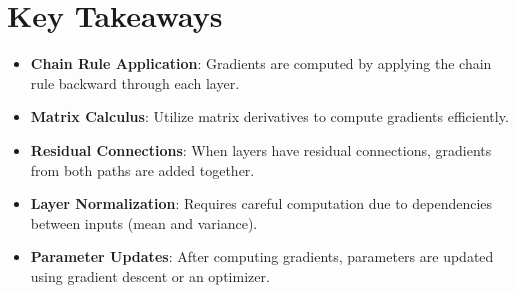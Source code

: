 \documentclass{article}
\begin{document}
\section{Key Takeaways}

\begin{itemize}
    \item \textbf{Chain Rule Application}: Gradients are computed by applying the chain rule backward through each layer.
    \item \textbf{Matrix Calculus}: Utilize matrix derivatives to compute gradients efficiently.
    \item \textbf{Residual Connections}: When layers have residual connections, gradients from both paths are added together.
    \item \textbf{Layer Normalization}: Requires careful computation due to dependencies between inputs (mean and variance).
    \item \textbf{Parameter Updates}: After computing gradients, parameters are updated using gradient descent or an optimizer.
\end{itemize}
\end{document}
